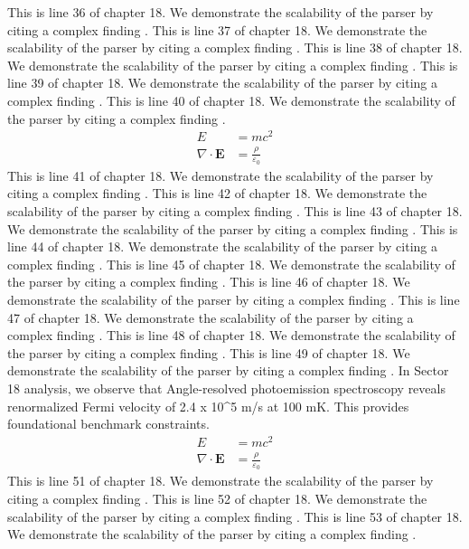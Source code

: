 This is line 36 of chapter 18. We demonstrate the scalability of the parser by citing a complex finding \cite{ref18_36}.
This is line 37 of chapter 18. We demonstrate the scalability of the parser by citing a complex finding \cite{ref18_37}.
This is line 38 of chapter 18. We demonstrate the scalability of the parser by citing a complex finding \cite{ref18_38}.
This is line 39 of chapter 18. We demonstrate the scalability of the parser by citing a complex finding \cite{ref18_39}.
This is line 40 of chapter 18. We demonstrate the scalability of the parser by citing a complex finding \cite{ref18_40}.
\begin{align*}
  E &= mc^2 \\
  \nabla \cdot \mathbf{E} &= \frac{\rho}{\varepsilon_0}
\end{align*}
This is line 41 of chapter 18. We demonstrate the scalability of the parser by citing a complex finding \cite{ref18_41}.
This is line 42 of chapter 18. We demonstrate the scalability of the parser by citing a complex finding \cite{ref18_42}.
This is line 43 of chapter 18. We demonstrate the scalability of the parser by citing a complex finding \cite{ref18_43}.
This is line 44 of chapter 18. We demonstrate the scalability of the parser by citing a complex finding \cite{ref18_44}.
This is line 45 of chapter 18. We demonstrate the scalability of the parser by citing a complex finding \cite{ref18_45}.
This is line 46 of chapter 18. We demonstrate the scalability of the parser by citing a complex finding \cite{ref18_46}.
This is line 47 of chapter 18. We demonstrate the scalability of the parser by citing a complex finding \cite{ref18_47}.
This is line 48 of chapter 18. We demonstrate the scalability of the parser by citing a complex finding \cite{ref18_48}.
This is line 49 of chapter 18. We demonstrate the scalability of the parser by citing a complex finding \cite{ref18_49}.
In Sector 18 analysis, we observe that Angle-resolved photoemission spectroscopy reveals renormalized Fermi velocity of 2.4 x 10^5 m/s at 100 mK. This provides foundational benchmark constraints.
\begin{align*}
  E &= mc^2 \\
  \nabla \cdot \mathbf{E} &= \frac{\rho}{\varepsilon_0}
\end{align*}
This is line 51 of chapter 18. We demonstrate the scalability of the parser by citing a complex finding \cite{ref18_51}.
This is line 52 of chapter 18. We demonstrate the scalability of the parser by citing a complex finding \cite{ref18_52}.
This is line 53 of chapter 18. We demonstrate the scalability of the parser by citing a complex finding \cite{ref18_53}.
